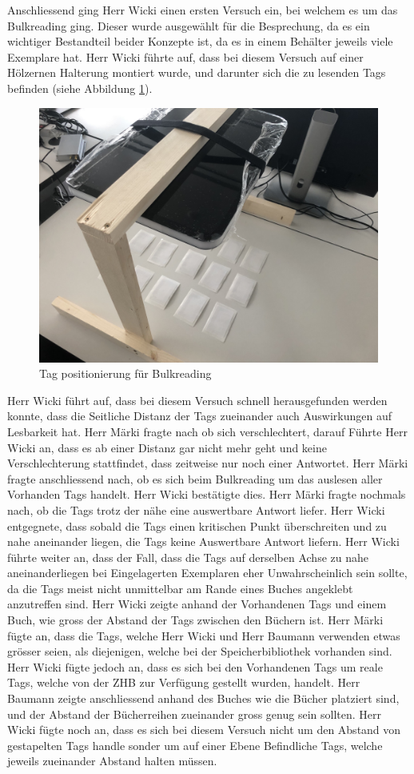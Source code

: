 \documentclass[parskip=full, a4paper]{scrreprt}
\begin{document}
Anschliessend ging Herr Wicki einen ersten Versuch ein, bei welchem es um das Bulkreading ging. Dieser wurde ausgewählt für die Besprechung, da es ein wichtiger Bestandteil beider Konzepte ist, da es in einem Behälter jeweils viele Exemplare hat. Herr Wicki führte auf, dass bei diesem Versuch auf einer Hölzernen Halterung montiert wurde, und darunter sich die zu lesenden Tags befinden (siehe Abbildung \ref{fig:positionTagsForBulkreading}). 
\begin{figure}[htb]
	\centering
	\includegraphics[keepaspectratio,width=.7\linewidth]{img/PositionTagsBulkreading}
	\caption{Tag positionierung für Bulkreading}
	\label{fig:positionTagsForBulkreading}
\end{figure}
Herr Wicki führt auf, dass bei diesem Versuch schnell herausgefunden werden konnte, dass die Seitliche Distanz der Tags zueinander auch Auswirkungen auf Lesbarkeit hat. Herr Märki fragte nach ob sich verschlechtert, darauf Führte Herr Wicki an, dass es ab einer Distanz gar nicht mehr geht und keine Verschlechterung stattfindet, dass zeitweise nur noch einer Antwortet. Herr Märki fragte anschliessend nach, ob es sich beim Bulkreading um das auslesen aller Vorhanden Tags handelt. Herr Wicki bestätigte dies. Herr Märki fragte nochmals nach, ob die Tags trotz der nähe eine auswertbare Antwort liefer. Herr Wicki entgegnete, dass sobald die Tags einen kritischen Punkt überschreiten und zu nahe aneinander liegen, die Tags keine Auswertbare Antwort liefern. Herr Wicki führte weiter an, dass der Fall, dass die Tags auf derselben Achse zu nahe aneinanderliegen bei Eingelagerten Exemplaren eher Unwahrscheinlich sein sollte, da die Tags meist nicht unmittelbar am Rande eines Buches angeklebt anzutreffen sind. Herr Wicki zeigte anhand der Vorhandenen Tags und einem Buch, wie gross der Abstand der Tags zwischen den Büchern ist. Herr Märki fügte an, dass die Tags, welche Herr Wicki und Herr Baumann verwenden etwas grösser seien, als diejenigen, welche bei der Speicherbibliothek vorhanden sind. Herr Wicki fügte jedoch an, dass es sich bei den Vorhandenen Tags um reale Tags, welche von der ZHB zur Verfügung gestellt wurden, handelt. Herr Baumann zeigte anschliessend anhand des Buches wie die Bücher platziert sind, und der Abstand der Bücherreihen zueinander gross genug sein sollten. Herr Wicki fügte noch an, dass es sich bei diesem Versuch nicht um den Abstand von gestapelten Tags handle sonder um auf einer Ebene Befindliche Tags, welche jeweils zueinander Abstand halten müssen.
\end{document}

